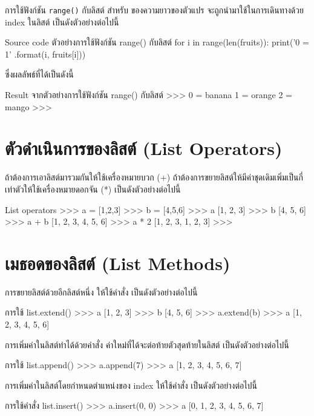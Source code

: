 การใช้ฟังก์ชัน  \texttt{range()} กับลิสต์ สำหรับ   ของความยาวของตัวแปร จะถูกนำมาใช้ในการเดินทางด้วย index ในลิสต์ เป็นดังตัวอย่างต่อไปนี้

\begin{codelist}{Source code ตัวอย่างการใช้ฟังก์ชัน range() กับลิสต์}{}
for i in range(len(fruits)):
    print('{0} = {1}' .format(i, fruits[i]))
\end{codelist}

ซึ่งผลลัพธ์ที่ได้เป็นดังนี้

\begin{codelist}{Result จากตัวอย่างการใช้ฟังก์ชัน range() กับลิสต์}{}
>>>
0 = banana
1 = orange
2 = mango
>>>
\end{codelist}

\section{ตัวดำเนินการของลิสต์ (List Operators)}

ถ้าต้องการเอาลิสต์มารวมกันให้ใช้เครื่องหมายบวก (+) ถ้าต้องการขยายลิสต์ให้มีค่าชุดเดิมเพิ่มเป็นกี่เท่าตัวให้ใช้เครื่องหมายดอกจัน (*) เป็นดังตัวอย่างต่อไปนี้

\begin{codelist}{List operators}{}
>>> a = [1,2,3]
>>> b = [4,5,6]
>>> a
[1, 2, 3]
>>> b
[4, 5, 6]
>>> a + b
[1, 2, 3, 4, 5, 6]
>>> a * 2
[1, 2, 3, 1, 2, 3]
>>>
\end{codelist}


\section{เมธอดของลิสต์ (List Methods)}

การขยายลิสต์ด้วยอีกลิสต์หนึ่ง ให้ใช้คำสั่ง   เป็นดังตัวอย่างต่อไปนี้
\begin{codelist}{การใช้ list.extend()}{}
>>> a
[1, 2, 3]
>>> b
[4, 5, 6]
>>> a.extend(b)
>>> a
[1, 2, 3, 4, 5, 6]
\end{codelist}

การเพิ่มค่าในลิสต์ทำได้ด้วยคำสั่ง   ค่าใหม่ที่ได้จะต่อท้ายตัวสุดท้ายในลิสต์ เป็นดังตัวอย่างต่อไปนี้
\begin{codelist}{การใช้ list.append()}{}
>>> a.append(7)
>>> a
[1, 2, 3, 4, 5, 6, 7]
\end{codelist}


การเพิ่มค่าในลิสต์โดยกำหนดตำแหน่งของ  index ให้ใช้คำสั่ง   เป็นดังตัวอย่างต่อไปนี้
\begin{codelist}{การใช้คำสั่ง list.insert()}{}
>>> a.insert(0, 0)
>>> a
[0, 1, 2, 3, 4, 5, 6, 7]
\end{codelist}



